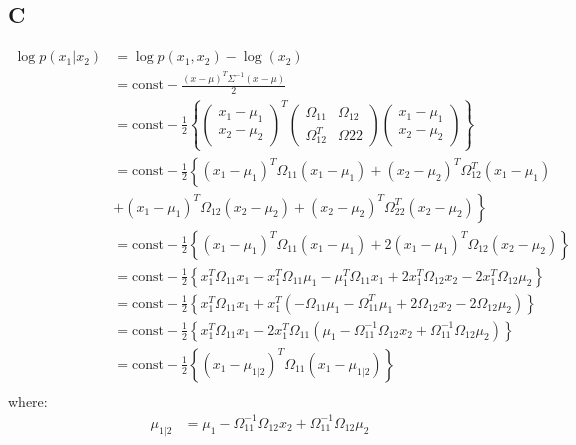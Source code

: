 \documentclass{article}
\begin{document}
\subsection*{C}
\begin{align*}
\log p(x_1|x_2) &= \log p(x_1, x_2) - \log(x_2)\\
&= \mbox{const} -\frac{(x-\mu)^T\Sigma^{-1}(x-\mu)}{2}\\
&=\mbox{const} - \frac{1}{2} \left\lbrace \begin{pmatrix} x_1 - \mu_1 \\x_2 - \mu_2 \end{pmatrix}^{T} \begin{pmatrix}
\Omega_{11} & \Omega_{12}\\
\Omega_{12}^T & \Omega{22}
\end{pmatrix} \begin{pmatrix} x_1 - \mu_1 \\x_2 - \mu_2 \end{pmatrix}   \right\rbrace\\
&= \mbox{const} - \frac{1}{2} \left\lbrace (x_1 - \mu_1)^T\Omega_{11}(x_1-\mu_1) + (x_2-\mu_2)^T\Omega_{12}^T(x_1-\mu_1) \right.  \\
& \left.  + (x_1 - \mu_1)^T\Omega_{12}(x_2-\mu_2) + (x_2-\mu_2)^T\Omega_{22}^T(x_2-\mu_2) \right\rbrace\\
&= \mbox{const} - \frac{1}{2} \left\lbrace (x_1 - \mu_1)^T\Omega_{11}(x_1-\mu_1) + 2(x_1-\mu_1)^T\Omega_{12}(x_2-\mu_2) \right\rbrace\\
&= \mbox{const} - \frac{1}{2} \left\lbrace x_1^T\Omega_{11}x_1 - x_1^T\Omega_{11}\mu_1 - \mu_1^T\Omega_{11}x_1 +   2x_1^T\Omega_{12}x_2 - 2x_1^T\Omega_{12}\mu_2 \right\rbrace\\
&= \mbox{const} - \frac{1}{2}\left\lbrace x_1^T\Omega_{11}x_1 + x_1^T\left(  - \Omega_{11}\mu_1 - \Omega_{11}^T\mu_1 + 2\Omega_{12}x_2 - 2\Omega_{12}\mu_2  \right)   \right\rbrace\\
&= \mbox{const} - \frac{1}{2}\left\lbrace x_1^T\Omega_{11}x_1 - 2 x_1^T\Omega_{11}\left(  \mu_1 - \Omega_{11}^{-1}\Omega_{12}x_2  + \Omega_{11}^{-1}\Omega_{12}\mu_2  \right)   \right\rbrace\\
&= \mbox{const} - \frac{1}{2}\left\lbrace (x_1 - \mu_{1|2})^T\Omega_{11}(x_1 - \mu_{1|2})  \right\rbrace\\
\end{align*}
where:
\begin{align*}
\mu_{1|2} &= \mu_1 - \Omega_{11}^{-1}\Omega_{12}x_2  + \Omega_{11}^{-1}\Omega_{12}\mu_2\\
\end{align*}
\end{document}
